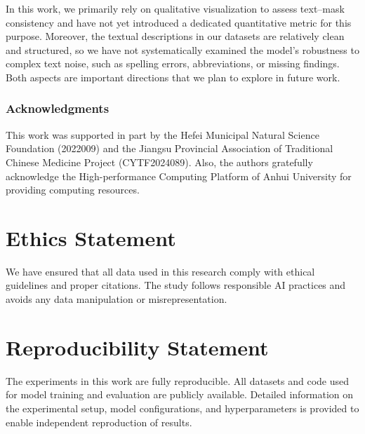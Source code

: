 \documentclass{article} %
\begin{document}
In this work, we primarily rely on qualitative visualization to assess text–mask consistency and have not yet introduced a dedicated quantitative metric for this purpose. Moreover, the textual descriptions in our datasets are relatively clean and structured, so we have not systematically examined the model’s robustness to complex text noise, such as spelling errors, abbreviations, or missing findings. Both aspects are important directions that we plan to explore in future work.


\subsubsection*{Acknowledgments}

This work was supported in part by the Hefei Municipal Natural Science Foundation (2022009) and the Jiangsu Provincial Association of Traditional Chinese Medicine Project (CYTF2024089). Also, the authors gratefully acknowledge the High-performance Computing Platform of Anhui University for providing computing resources.





\newpage
\appendix

\section{Ethics Statement}
We have ensured that all data used in this research comply with ethical guidelines and proper citations. The study follows responsible AI practices and avoids any data manipulation or misrepresentation.

\section{Reproducibility Statement}
The experiments in this work are fully reproducible. All datasets and code used for model training and evaluation are publicly available. Detailed information on the experimental setup, model configurations, and hyperparameters is provided to enable independent reproduction of results.
\end{document}
